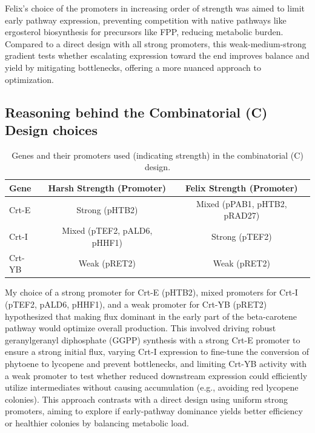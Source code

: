 \documentclass[12pt,a4paper]{article}
\begin{document}
Felix's choice of the promoters in increasing order of strength was aimed to
limit early pathway expression, preventing competition with native pathways
like ergosterol biosynthesis for precursors like FPP, reducing metabolic
burden. Compared to a direct design with all strong promoters, this
weak-medium-strong gradient tests whether escalating expression toward the end
improves balance and yield by mitigating bottlenecks, offering a more nuanced
approach to optimization.

\subsection{Reasoning behind the Combinatorial (C) Design choices}
\begin{table}[h]
    \centering
    \begin{tabular}{|l|c|c|}
        \hline
        \textbf{Gene} & Harsh Strength (Promoter)   & Felix Strength (Promoter)    \\
        \hline
        Crt-E         & Strong (pHTB2)              & Mixed (pPAB1, pHTB2, pRAD27) \\
        \hline
        Crt-I         & Mixed (pTEF2, pALD6, pHHF1) & Strong (pTEF2)               \\
        \hline
        Crt-YB        & Weak (pRET2)                & Weak (pRET2)                 \\
        \hline
    \end{tabular}
    \caption{\centering Genes and their promoters used (indicating strength) in the combinatorial (C) design.}\label{tab:comb_design}
\end{table}

My choice of a strong promoter for Crt-E (pHTB2), mixed promoters for Crt-I
(pTEF2, pALD6, pHHF1), and a weak promoter for Crt-YB (pRET2) hypothesized that
making flux dominant in the early part of the beta-carotene pathway would
optimize overall production. This involved driving robust geranylgeranyl
diphosphate (GGPP) synthesis with a strong Crt-E promoter to ensure a strong
initial flux, varying Crt-I expression to fine-tune the conversion of phytoene
to lycopene and prevent bottlenecks, and limiting Crt-YB activity with a weak
promoter to test whether reduced downstream expression could efficiently
utilize intermediates without causing accumulation (e.g., avoiding red lycopene
colonies). This approach contrasts with a direct design using uniform strong
promoters, aiming to explore if early-pathway dominance yields better
efficiency or healthier colonies by balancing metabolic load.
\end{document}

